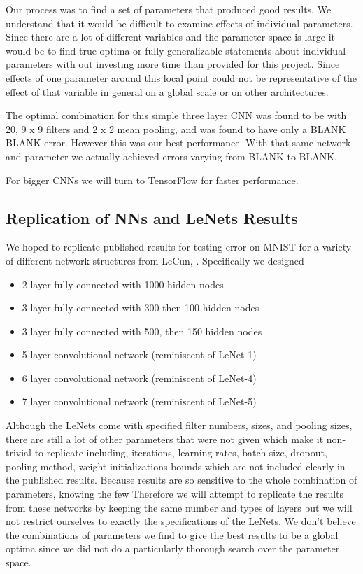 \documentclass[12pt, twocolumn]{article}
\begin{document}
Our process was to find a set of parameters that produced good results. We understand that it would be difficult to examine effects of individual parameters. Since there are a lot of different variables and the parameter space is large it would be to find true optima or fully generalizable statements about individual parameters with out investing more time than provided for this project. Since effects of one parameter around this local point could not be representative of the effect of that variable in general on a global scale or on other architectures. 

The optimal combination for this simple three layer CNN was found to be with 20, 9 x 9 filters and 2 x 2 mean pooling, and was found to have only a BLANK  BLANK error. However this was our best performance. With that same network and parameter we actually achieved errors varying from BLANK to BLANK. 


For bigger CNNs we will turn to TensorFlow for faster performance. 
\subsection{Replication of NNs and LeNets Results}

We hoped to replicate published results for testing error on MNIST for a variety of different network structures from LeCun, \cite{LeCun1998}. Specifically we designed

\begin{itemize}
\item{2 layer fully connected with 1000 hidden nodes}
\item{3 layer fully connected with 300 then 100 hidden nodes}
\item{3 layer fully connected with 500, then 150 hidden nodes}
\item{5 layer convolutional network (reminiscent of LeNet-1)}
\item{6 layer convolutional network (reminiscent of LeNet-4)}
\item{7 layer convolutional network (reminiscent of LeNet-5)}
\end{itemize}


Although the LeNets come with specified filter numbers, sizes, and pooling sizes, there are still a lot of other parameters that were not given which make it non-trivial to replicate including, iterations, learning rates, batch size, dropout, pooling method, weight initializations bounds which are not included clearly in the published results. Because results are so sensitive to the whole combination of parameters, knowing the few  Therefore we will attempt to replicate the results from these networks by keeping the same number and types of layers but we will not restrict ourselves to exactly the specifications of the LeNets. We don't  believe the combinations of parameters we find to give the best results to be a global optima since we did not do a particularly thorough search over the parameter space. 
\end{document}
